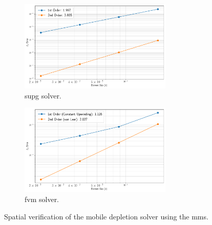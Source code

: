 \begin{figure}[H]
    \centering
    \begin{subfigure}[b]{\textwidth}
        \centering
        \includegraphics[width=0.8\textwidth]{images/verification/depletion/nuclide_mms_spatial_fe.png}
        \caption{\acrshort{supg} solver.}
        \label{fig:verification:dep:spatial:fe}
    \end{subfigure}
    \hfill
    \begin{subfigure}[b]{\textwidth}
        \centering
        \includegraphics[width=0.8\textwidth]{images/verification/depletion/nuclide_mms_spatial_fv.png}
        \caption{\acrshort{fvm} solver.}
        \label{fig:verification:dep:spatial:fv}
    \end{subfigure}
    \caption{Spatial verification of the mobile depletion solver using the \acrshort{mms}.}
    \label{fig:verification:dep:spatial}
\end{figure}

